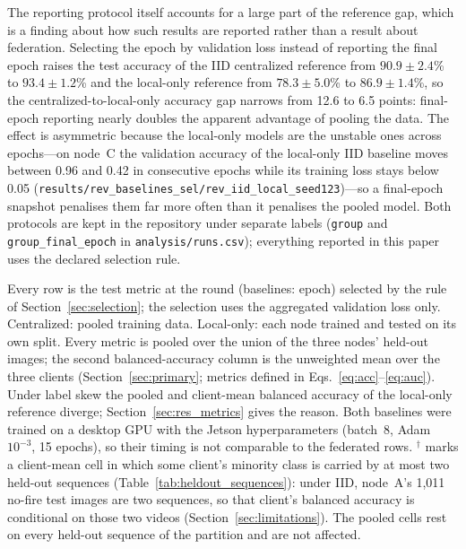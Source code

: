 \documentclass[journal]{IEEEtran}
\begin{document}
The reporting protocol itself accounts for a large part of the reference gap, which is a finding about how such results are reported rather than a result about federation. Selecting the epoch by validation loss instead of reporting the final epoch raises the test accuracy of the IID centralized reference from $90.9 \pm 2.4$\% to $93.4 \pm 1.2$\% and the local-only reference from $78.3 \pm 5.0$\% to $86.9 \pm 1.4$\%, so the centralized-to-local-only accuracy gap narrows from 12.6 to 6.5 points: final-epoch reporting nearly doubles the apparent advantage of pooling the data. The effect is asymmetric because the local-only models are the unstable ones across epochs---on node~C the validation accuracy of the local-only IID baseline moves between 0.96 and 0.42 in consecutive epochs while its training loss stays below 0.05 (\nolinkurl{results/rev_baselines_sel/rev_iid_local_seed123})---so a final-epoch snapshot penalises them far more often than it penalises the pooled model. Both protocols are kept in the repository under separate labels (\texttt{group} and \texttt{group\_final\_epoch} in \texttt{analysis/runs.csv}); everything reported in this paper uses the declared selection rule.

\begin{table}[t]
\centering
\caption{Test-Set Metrics Under the Group-Level Split (3-Node, $n=5$ Seeds; Balanced Accuracy mean [95\% CI], Other Metrics mean $\pm$ std; Percentages Except MCC)}
\label{tab:fullmetrics}
\setlength{\tabcolsep}{3.5pt}

\vspace{2pt}
\parbox{\textwidth}{\footnotesize Every row is the test metric at the round (baselines: epoch) selected by the rule of Section~\ref{sec:selection}; the selection uses the aggregated validation loss only. Centralized: pooled training data. Local-only: each node trained and tested on its own split. Every metric is pooled over the union of the three nodes' held-out images; the second balanced-accuracy column is the unweighted mean over the three clients (Section~\ref{sec:primary}; metrics defined in Eqs.~\eqref{eq:acc}--\eqref{eq:auc}). Under label skew the pooled and client-mean balanced accuracy of the local-only reference diverge; Section~\ref{sec:res_metrics} gives the reason. Both baselines were trained on a desktop GPU with the Jetson hyperparameters (batch~8, Adam $10^{-3}$, 15 epochs), so their timing is not comparable to the federated rows. $^{\dagger}$ marks a client-mean cell in which some client's minority class is carried by at most two held-out sequences (Table~\ref{tab:heldout_sequences}): under IID, node~A's 1{,}011 no-fire test images are two sequences, so that client's balanced accuracy is conditional on those two videos (Section~\ref{sec:limitations}). The pooled cells rest on every held-out sequence of the partition and are not affected.}
\end{table}
\end{document}
